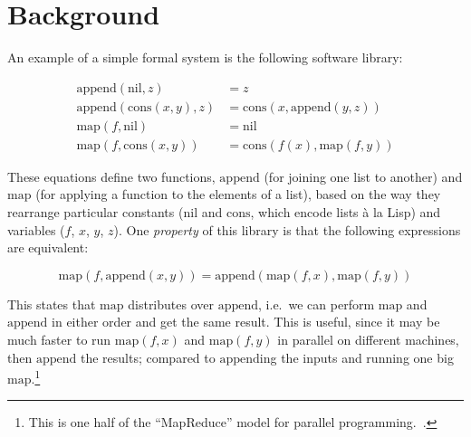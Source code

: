 \documentclass[]{default}
\newcommand{\name}[1]{\mathrm{#1}}
\begin{document}
\vspace{-2mm}

\section{Background}\label{background}

An example of a simple formal system is the following software
library:

\vspace{-5mm}

\begin{equation*}
  \begin{aligned}
    \name{append}(\name{nil},        z) &= z                                   \\
    \name{append}(\name{cons}(x,y),  z) &= \name{cons}(x, \name{append}(y, z)) \\
    \name{map}(f,           \name{nil}) &= \name{nil}                          \\
    \name{map}(f,    \name{cons}(x, y)) &= \name{cons}(f(x), \name{map}(f, y))
  \end{aligned}
\end{equation*}

These equations define two functions, $\name{append}$ (for joining one list to
another) and $\name{map}$ (for applying a function to the elements of a list),
based on the way they rearrange particular constants ($\name{nil}$ and
$\name{cons}$, which encode lists à la Lisp) and variables ($f$, $x$, $y$, $z$).
One \emph{property} of this library is that the following expressions are
equivalent:

\vspace{-3mm}

\begin{equation}\label{eq:mapappend}
  \name{map}(f, \name{append}(x, y)) =
    \name{append}(\name{map}(f, x), \name{map}(f, y))
\end{equation}

This states that $\name{map}$ distributes over $\name{append}$, i.e.\ we can
perform $\name{map}$ and $\name{append}$ in either order and get the same
result. This is useful, since it may be much faster to run $\name{map}(f, x)$
and $\name{map}(f, y)$ in parallel on different machines, then $\name{append}$
the results; compared to $\name{append}$ing the inputs and running one big
$\name{map}$.\footnote{This is one half of the ``MapReduce'' model for parallel
  programming.~\cite{dean2008mapreduce}.}
\end{document}
